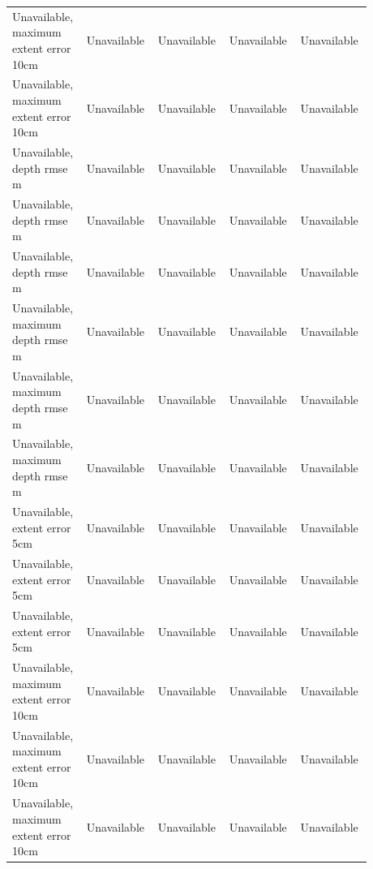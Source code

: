\begin{longtable}{p{0.1760\linewidth}p{0.1760\linewidth}p{0.1760\linewidth}p{0.1760\linewidth}p{0.1760\linewidth}}
Unavailable, maximum extent error 10cm & Unavailable & Unavailable & Unavailable & Unavailable \\
Unavailable, maximum extent error 10cm & Unavailable & Unavailable & Unavailable & Unavailable \\
Unavailable, depth rmse m & Unavailable & Unavailable & Unavailable & Unavailable \\
Unavailable, depth rmse m & Unavailable & Unavailable & Unavailable & Unavailable \\
Unavailable, depth rmse m & Unavailable & Unavailable & Unavailable & Unavailable \\
Unavailable, maximum depth rmse m & Unavailable & Unavailable & Unavailable & Unavailable \\
Unavailable, maximum depth rmse m & Unavailable & Unavailable & Unavailable & Unavailable \\
Unavailable, maximum depth rmse m & Unavailable & Unavailable & Unavailable & Unavailable \\
Unavailable, extent error 5cm & Unavailable & Unavailable & Unavailable & Unavailable \\
Unavailable, extent error 5cm & Unavailable & Unavailable & Unavailable & Unavailable \\
Unavailable, extent error 5cm & Unavailable & Unavailable & Unavailable & Unavailable \\
Unavailable, maximum extent error 10cm & Unavailable & Unavailable & Unavailable & Unavailable \\
Unavailable, maximum extent error 10cm & Unavailable & Unavailable & Unavailable & Unavailable \\
Unavailable, maximum extent error 10cm & Unavailable & Unavailable & Unavailable & Unavailable \\
\end{longtable}
